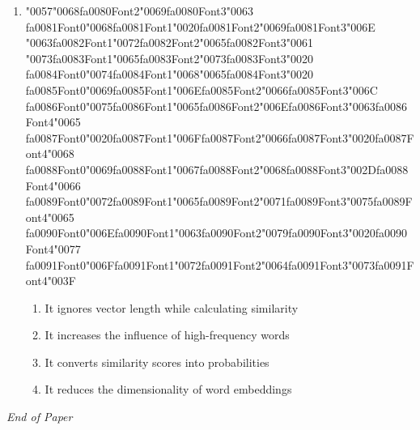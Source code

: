 \documentclass[12pt]{article}
\begin{document}
\begin{enumerate}[label=Q\arabic*.]
\item {\char"0057}{\char"0068}{\csname fa0080Font2\endcsname\char"0069}{\csname fa0080Font3\endcsname\char"0063} {\csname fa0081Font0\endcsname\char"0068}{\csname fa0081Font1\endcsname\char"0020}{\csname fa0081Font2\endcsname\char"0069}{\csname fa0081Font3\endcsname\char"006E} {\char"0063}{\csname fa0082Font1\endcsname\char"0072}{\csname fa0082Font2\endcsname\char"0065}{\csname fa0082Font3\endcsname\char"0061} {\char"0073}{\csname fa0083Font1\endcsname\char"0065}{\csname fa0083Font2\endcsname\char"0073}{\csname fa0083Font3\endcsname\char"0020} {\csname fa0084Font0\endcsname\char"0074}{\csname fa0084Font1\endcsname\char"0068}{\char"0065}{\csname fa0084Font3\endcsname\char"0020} {\csname fa0085Font0\endcsname\char"0069}{\csname fa0085Font1\endcsname\char"006E}{\csname fa0085Font2\endcsname\char"0066}{\csname fa0085Font3\endcsname\char"006C} {\csname fa0086Font0\endcsname\char"0075}{\csname fa0086Font1\endcsname\char"0065}{\csname fa0086Font2\endcsname\char"006E}{\csname fa0086Font3\endcsname\char"0063}{\csname fa0086Font4\endcsname\char"0065} {\csname fa0087Font0\endcsname\char"0020}{\csname fa0087Font1\endcsname\char"006F}{\csname fa0087Font2\endcsname\char"0066}{\csname fa0087Font3\endcsname\char"0020}{\csname fa0087Font4\endcsname\char"0068} {\csname fa0088Font0\endcsname\char"0069}{\csname fa0088Font1\endcsname\char"0067}{\csname fa0088Font2\endcsname\char"0068}{\csname fa0088Font3\endcsname\char"002D}{\csname fa0088Font4\endcsname\char"0066} {\csname fa0089Font0\endcsname\char"0072}{\csname fa0089Font1\endcsname\char"0065}{\csname fa0089Font2\endcsname\char"0071}{\csname fa0089Font3\endcsname\char"0075}{\csname fa0089Font4\endcsname\char"0065} {\csname fa0090Font0\endcsname\char"006E}{\csname fa0090Font1\endcsname\char"0063}{\csname fa0090Font2\endcsname\char"0079}{\csname fa0090Font3\endcsname\char"0020}{\csname fa0090Font4\endcsname\char"0077} {\csname fa0091Font0\endcsname\char"006F}{\csname fa0091Font1\endcsname\char"0072}{\csname fa0091Font2\endcsname\char"0064}{\csname fa0091Font3\endcsname\char"0073}{\csname fa0091Font4\endcsname\char"003F}
\begin{enumerate}[label=(\Alph*)]
    \item It ignores vector length while calculating similarity
    \item It increases the influence of high-frequency words
    \item It converts similarity scores into probabilities
    \item It reduces the dimensionality of word embeddings
\end{enumerate}
\end{enumerate}

\vfill
\noindent\textit{End of Paper}
\end{document}
